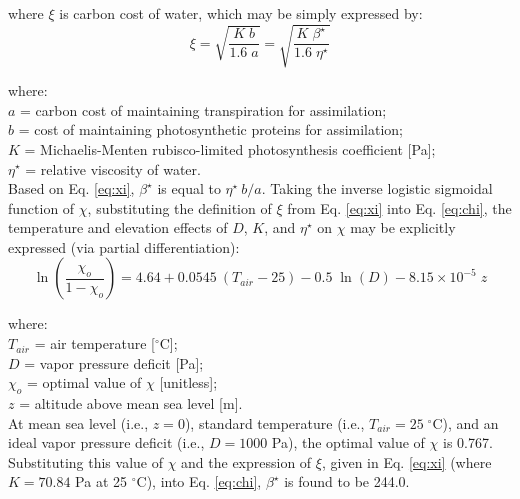 \noindent where $\xi$ is carbon cost of water, which may be simply expressed by:
%
\begin{equation}
\label{eq:xi}
    \xi = \sqrt{\frac{K\; b}{1.6\; a}} = \sqrt{\frac{K\; \beta^\star}{1.6\; \eta^\star}}
\end{equation}

\noindent where:\\
\indent $a$ = carbon cost of maintaining transpiration for assimilation; \\
\indent $b$ = cost of maintaining photosynthetic proteins for assimilation;\\
\indent $K$ = Michaelis-Menten rubisco-limited photosynthesis coefficient [Pa];\\
\indent $\eta^\star$ = relative viscosity of water.\\

Based on Eq. \ref{eq:xi}, $\beta^\star$ is equal to $\eta^\star\: b/a$.
Taking the inverse logistic sigmoidal function of $\chi$, substituting the definition of $\xi$ from Eq. \ref{eq:xi} into Eq. \ref{eq:chi}, the temperature and elevation effects of $D$, $K$, and $\eta^\star$ on $\chi$ may be explicitly expressed (via partial differentiation):
\begin{equation}
\label{eq:whe}
    \ln \left(\frac{\chi_o}{1 - \chi_o}\right) = 4.64 + 
    	0.0545\: \left(T_{air} - 25\right) - 
    	0.5\; \ln (D) - 
    	8.15\times 10^{-5}\; z
\end{equation}

\noindent where:\\
\indent $T_{air}$ = air temperature [${}^\circ$C];\\
\indent $D$ = vapor pressure deficit [Pa];\\
\indent $\chi_o$ = optimal value of $\chi$ [unitless];\\
\indent $z$ = altitude above mean sea level [m].\\

\noindent At mean sea level (i.e., $z = 0$), standard temperature (i.e., $T_{air} = 25\;{}^\circ$C), and an ideal vapor pressure deficit (i.e., $D = 1000$ Pa), the optimal value of $\chi$ is 0.767. Substituting this value of $\chi$ and the expression of $\xi$, given in Eq. \ref{eq:xi} (where $K = 70.84$ Pa at 25 ${}^\circ$C), into Eq. \ref{eq:chi}, $\beta^\star$ is found to be 244.0. 


